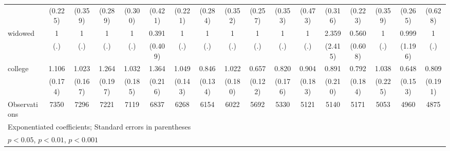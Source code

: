 {\begin{tabular}{l*{16}{c}}
                    &     (0.225)         &     (0.359)         &     (0.289)         &     (0.300)         &     (0.421)         &     (0.221)         &     (0.284)         &     (0.352)         &     (0.257)         &     (0.353)         &     (0.473)         &     (0.316)         &     (0.223)         &     (0.359)         &     (0.265)         &     (0.628)         \\
[1em]
widowed             &           1         &           1         &           1         &           1         &       0.391         &           1         &           1         &           1         &           1         &           1         &           1         &       2.359         &       0.560         &           1         &       0.999         &           1         \\
                    &         (.)         &         (.)         &         (.)         &         (.)         &     (0.409)         &         (.)         &         (.)         &         (.)         &         (.)         &         (.)         &         (.)         &     (2.415)         &     (0.608)         &         (.)         &     (1.196)         &         (.)         \\
[1em]
college             &       1.106         &       1.023         &       1.264         &       1.032         &       1.364\sym{*}  &       1.049         &       0.846         &       1.022         &       0.657\sym{*}  &       0.820         &       0.904         &       0.891         &       0.792         &       1.038         &       0.648         &       0.809         \\
                    &     (0.174)         &     (0.167)         &     (0.197)         &     (0.185)         &     (0.216)         &     (0.143)         &     (0.134)         &     (0.180)         &     (0.122)         &     (0.176)         &     (0.183)         &     (0.210)         &     (0.184)         &     (0.225)         &     (0.153)         &     (0.191)         \\
\hline
Observations        &        7350         &        7296         &        7221         &        7119         &        6837         &        6268         &        6154         &        6022         &        5692         &        5330         &        5121         &        5140         &        5171         &        5053         &        4960         &        4875         \\
\hline\hline
\multicolumn{17}{l}{\footnotesize Exponentiated coefficients; Standard errors in parentheses}\\
\multicolumn{17}{l}{\footnotesize \sym{*} \(p<0.05\), \sym{**} \(p<0.01\), \sym{***} \(p<0.001\)}\\
\end{tabular}
}
